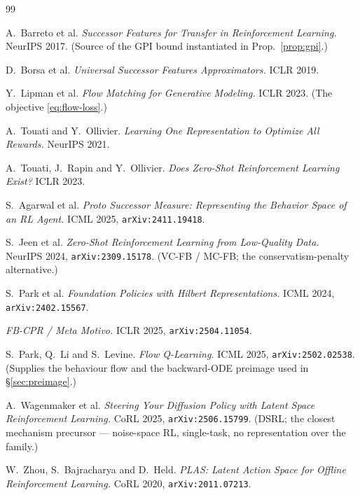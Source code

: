 \documentclass[11pt]{article}
\theoremstyle{plain}
\theoremstyle{definition}
\theoremstyle{remark}
\newcommand{\1}{\mathbf 1}
\begin{document}
\begin{thebibliography}{99}

 A.~Barreto et al.
  \emph{Successor Features for Transfer in Reinforcement Learning.} NeurIPS 2017.
  (Source of the GPI bound instantiated in Prop.~\ref{prop:gpi}.)

 D.~Borsa et al.
  \emph{Universal Successor Features Approximators.} ICLR 2019.

 Y.~Lipman et al.
  \emph{Flow Matching for Generative Modeling.} ICLR 2023.
  (The objective \eqref{eq:flow-loss}.)

 A.~Touati and Y.~Ollivier.
  \emph{Learning One Representation to Optimize All Rewards.} NeurIPS 2021.

 A.~Touati, J.~Rapin and Y.~Ollivier.
  \emph{Does Zero-Shot Reinforcement Learning Exist?} ICLR 2023.

 S.~Agarwal et al.
  \emph{Proto Successor Measure: Representing the Behavior Space of an RL Agent.}
  ICML 2025, \texttt{arXiv:2411.19418}.

 S.~Jeen et al.
  \emph{Zero-Shot Reinforcement Learning from Low-Quality Data.} NeurIPS 2024,
  \texttt{arXiv:2309.15178}. (VC-FB / MC-FB; the conservatism-penalty alternative.)

 S.~Park et al.
  \emph{Foundation Policies with Hilbert Representations.} ICML 2024,
  \texttt{arXiv:2402.15567}.

 \emph{FB-CPR / Meta Motivo.} ICLR 2025,
  \texttt{arXiv:2504.11054}.

 S.~Park, Q.~Li and S.~Levine.
  \emph{Flow Q-Learning.} ICML 2025, \texttt{arXiv:2502.02538}.
  (Supplies the behaviour flow and the backward-ODE preimage used in \S\ref{sec:preimage}.)

 A.~Wagenmaker et al.
  \emph{Steering Your Diffusion Policy with Latent Space Reinforcement Learning.}
  CoRL 2025, \texttt{arXiv:2506.15799}. (DSRL; the closest mechanism precursor ---
  noise-space RL, single-task, no representation over the family.)

 W.~Zhou, S.~Bajracharya and D.~Held.
  \emph{PLAS: Latent Action Space for Offline Reinforcement Learning.} CoRL 2020,
  \texttt{arXiv:2011.07213}.


\end{thebibliography}
\end{document}

